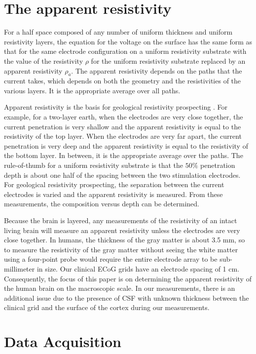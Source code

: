 \section{The apparent resistivity}
For a half space composed of any number of uniform thickness and uniform resistivity layers, the equation for the voltage on the surface has the same form as that for the same electrode configuration on a uniform resistivity substrate with the value of the resistivity $\rho$ for the uniform resistivity substrate replaced by an apparent resistivity $\rho_a$. The apparent resistivity depends on the paths that the current takes, which depends on both the geometry and the resistivities of the various layers. It is the appropriate average over all paths. 

Apparent resistivity is the basis for geological resistivity prospecting \cite{W.M.TelfordL.PGeldart1990}. For example, for a two-layer earth, when the electrodes are very close together, the current penetration is very shallow and the apparent resistivity is equal to the resistivity of the top layer. When the electrodes are very far apart, the current penetration is very deep and the apparent resistivity is equal to the resistivity of the bottom layer. In between, it is the appropriate average over the paths. The rule-of-thumb for a uniform resistivity substrate is that the $ 50 \%$ penetration depth is about one half of the spacing between the two stimulation electrodes. For geological resistivity prospecting, the separation between the current electrodes is varied and the apparent resistivity is measured. From these measurements, the composition versus depth can be determined.

Because the brain is layered, any measurements of the resistivity of an intact living brain will measure an apparent resistivity unless the electrodes are very close together. In humans, the thickness of the gray matter is about 3.5 mm, so to measure the resistivity of the gray matter without seeing the white matter using a four-point probe would require the entire electrode array to be sub-millimeter in size. Our clinical ECoG grids have an electrode spacing of 1 cm. Consequently, the focus of this paper is on determining the apparent resistivity of the human brain on the macroscopic scale. In our measurements, there is an additional issue  due to the presence of CSF with unknown thickness between the clinical grid and the surface of the cortex during our measurements. 


\section{Data Acquisition}

